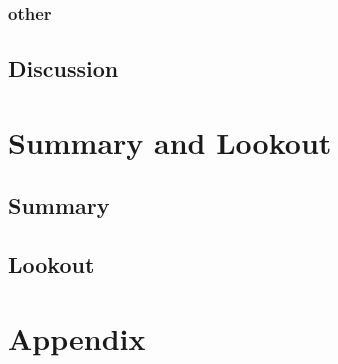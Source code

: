 	\subsection{other}
	\section{Discussion}
	\chapter{Summary and Lookout}
	\section{Summary}
	\section{Lookout}
	
	
	\appendix
	\chapter{Appendix}	
